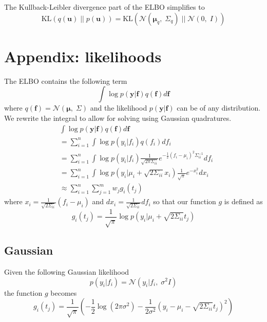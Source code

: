 \documentclass[5p,11pt]{article}
\begin{document}
The Kullback-Leibler divergence part of the ELBO simplifies to
$$ \mathrm{KL}(q(\bm{u})\;||\;p(\bm{u})) = \mathrm{KL}(\mathcal{N}(\bm{\mu}_q,\; \Sigma_q)\;||\;\mathcal{N}(0,\; I)) $$


\newpage
\section{Appendix: likelihoods}
The ELBO contains the following term
$$ \int \log p(\bm{y}|\bm{f}) q(\bm{f}) d\bm{f} $$
where $q(\bm{f}) = \mathcal{N}(\bm{\mu},\; \Sigma)$ and the likelihood $p(\bm{y}|\bm{f})$ can be of any distribution. We rewrite the integral to allow for solving using Gaussian quadratures.
\begin{equation}
    \begin{aligned}
    &\int \log p(\bm{y}|\bm{f}) q(\bm{f}) d\bm{f}\\
    &= \sum_{i=1}^n \int \log p(y_i|f_i) q(f_i) df_i\\
    &= \sum_{i=1}^n \int \log p(y_i|f_i) \frac{1}{\sqrt{2\pi\Sigma_{ii}}}e^{-\frac{1}{2}(f_i-\mu_i)^2\Sigma_{ii}^{-1}} df_i\\
    &= \sum_{i=1}^n \int \log p(y_i|\mu_i+\sqrt{2\Sigma_{ii}}x_i) \frac{1}{\sqrt{\pi}}e^{-x_i^2} dx_i\\
    &\approx \sum_{i=1}^n \sum_{j=1}^m w_j g_i(t_j)
    \end{aligned}
\end{equation}
where $x_i = \frac{1}{\sqrt{2\Sigma_{ii}}}(f_i-\mu_i)$ and $dx_i = \frac{1}{\sqrt{2\Sigma_{ii}}}df_i$ so that our function $g$ is defined as
$$ g_i(t_j) = \frac{1}{\sqrt{\pi}} \log p(y_i|\mu_i+\sqrt{2\Sigma_{ii}}t_j) $$

\subsection{Gaussian}
Given the following Gaussian likelihood
$$ p(y_i|f_i) = \mathcal{N}(y_i|f_i,\; \sigma^2I) $$
the function $g$ becomes
$$ g_i(t_j) = \frac{1}{\sqrt{\pi}} \left( -\frac{1}{2} \log (2\pi\sigma^2) - \frac{1}{2\sigma^2}(y_i-\mu_i-\sqrt{2\Sigma_{ii}}t_j)^2 \right) $$
\end{document}
